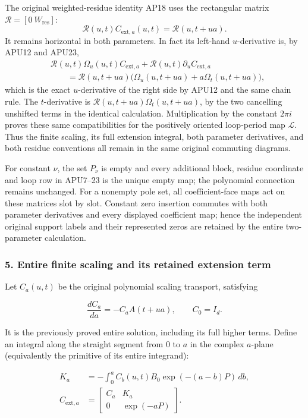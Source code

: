 The original weighted-residue identity AP18 uses the rectangular
matrix \(\mathcal R=[0\ W_{\mathrm{res}}]\):
\[
 \mathcal R(u,t)C_{\mathrm{ext},a}(u,t)
       =\mathcal R(u,t+ua).
\]
It remains horizontal in both parameters.  In fact its left-hand
\(u\)-derivative is, by APU12 and APU23,
\[
 \begin{aligned}
 &\mathcal R(u,t)\Omega_u(u,t)C_{\mathrm{ext},a}
           +\mathcal R(u,t)\partial_uC_{\mathrm{ext},a}\\
 &\qquad=
 \mathcal R(u,t+ua)
       \bigl(\Omega_u(u,t+ua)+a\Omega_t(u,t+ua)\bigr),
 \end{aligned}
\]
which is the exact \(u\)-derivative of the right side by APU12 and
the same chain rule.  The \(t\)-derivative is
\(\mathcal R(u,t+ua)\Omega_t(u,t+ua)\), by the two cancelling
unshifted terms in the identical calculation.
Multiplication by the constant \(2\pi i\) proves these same
compatibilities for the positively oriented loop-period map
\(\mathcal L\).  Thus the finite scaling, its full extension
integral, both parameter derivatives, and both residue conventions
all remain in the same original commuting diagrams.

For constant \(\nu\), the set \(P_\nu\) is empty and every additional
block, residue coordinate and loop row in APU7--23 is the unique
empty map; the polynomial connection remains unchanged.
For a nonempty pole set, all coefficient-face maps act on these
matrices slot by slot.  Constant zero insertion commutes with both
parameter derivatives and every displayed coefficient map; hence
the independent original support labels and their represented
zeros are retained by the entire two-parameter calculation.


\subsubsection{5. Entire finite scaling and its retained extension term}\label{endpoint-analytic_pole--entire-finite-scaling-and-its-retained-extension-term}

Let \(C_a(u,t)\) be the original polynomial scaling transport, satisfying

\[
\frac{dC_a}{da}=-C_a A(t+ua),\qquad C_0=I_d.
\tag{AP14}
\]

It is the previously proved entire solution, including its full higher terms. Define an integral along the straight segment from \(0\) to \(a\) in the complex \(a\)-plane (equivalently the primitive of its entire integrand):

\[
\begin{aligned}
K_a&=-\int_0^a C_b(u,t)B_0\exp(-(a-b)P)\,db,\\
C_{\mathrm{ext},a}&=\begin{bmatrix}C_a&K_a\\0&\exp(-aP)\end{bmatrix}.
\end{aligned}
\tag{AP15}
\]

